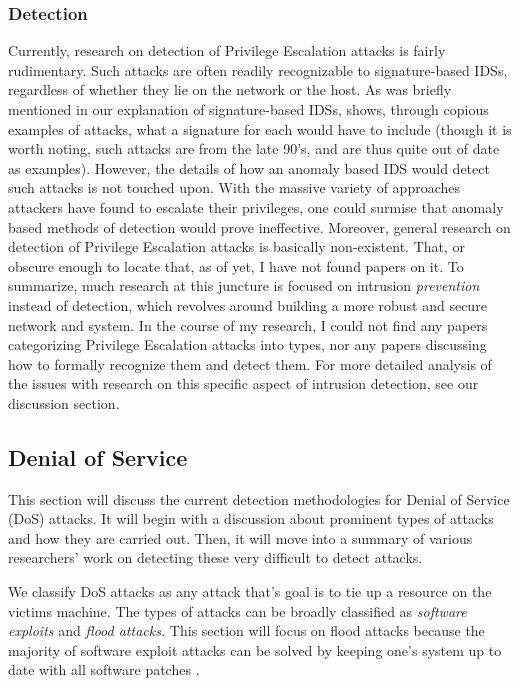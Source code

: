 \documentclass{acm_proc_article-sp}
\begin{document}
     \subsubsection{Detection}
     	Currently, research on detection of Privilege Escalation attacks is fairly rudimentary. Such attacks are often readily recognizable to signature-based IDSs, regardless of whether they lie on the network or the host. As was briefly mentioned in our explanation of signature-based IDSs, \cite{Labs1999} shows, through copious examples of attacks, what a signature for each would have to include (though it is worth noting, such attacks are from the late 90's, and are thus quite out of date as examples). However, the details of how an anomaly based IDS would detect such attacks is not touched upon. With the massive variety of approaches attackers have found to escalate their privileges, one could surmise that anomaly based methods of detection would prove ineffective. Moreover, general research on detection of Privilege Escalation attacks is basically non-existent. That, or obscure enough to locate that, as of yet, I have not found papers on it. To summarize, much research at this juncture is focused on intrusion \emph{prevention} instead of detection, which revolves around building a more robust and secure network and system. In the course of my research, I could not find any papers categorizing Privilege Escalation attacks into types, nor any papers discussing how to formally recognize them and detect them. For more detailed analysis of the issues with research on this specific aspect of intrusion detection, see our discussion section.
     
    \subsection{Denial of Service}
    	This section will discuss the current detection methodologies for Denial of Service (DoS) attacks. It will begin with a discussion about prominent types of attacks and how they are carried out. Then, it will move into a summary of various researchers' work on detecting these very difficult to detect attacks. %
    	
    	We classify DoS attacks as any attack that's goal is to tie up a resource on the victims machine. The types of attacks can be broadly classified as \emph{software exploits} and \emph{flood attacks.} This section will focus on flood attacks because the majority of software exploit attacks can be solved by keeping one's system up to date with all software patches \cite{Hussain2003}. 
    	
\end{document}
